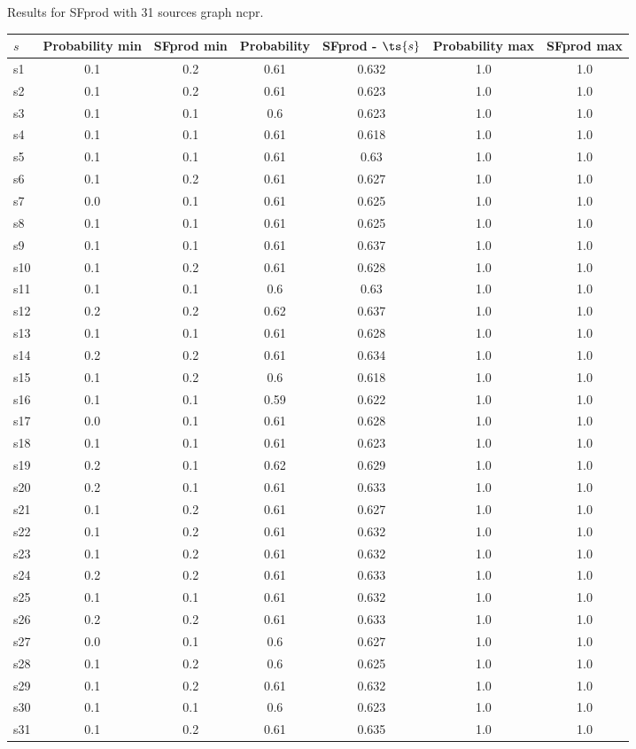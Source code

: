 \documentclass{article}
\begin{document}
\noindent Results for SFprod with 31 sources graph ncpr.

\noindent\begin{tabular}{|l|c|c|c|c|c|c|}
\hline
$s$& Probability min & SFprod min & Probability & SFprod - $\ts{s}$ & Probability max & SFprod max\\
\hline
s1 &0.1 & 0.2 & 0.61 & 0.632 & 1.0 & 1.0\\
\hline
s2 &0.1 & 0.2 & 0.61 & 0.623 & 1.0 & 1.0\\
\hline
s3 &0.1 & 0.1 & 0.6 & 0.623 & 1.0 & 1.0\\
\hline
s4 &0.1 & 0.1 & 0.61 & 0.618 & 1.0 & 1.0\\
\hline
s5 &0.1 & 0.1 & 0.61 & 0.63 & 1.0 & 1.0\\
\hline
s6 &0.1 & 0.2 & 0.61 & 0.627 & 1.0 & 1.0\\
\hline
s7 &0.0 & 0.1 & 0.61 & 0.625 & 1.0 & 1.0\\
\hline
s8 &0.1 & 0.1 & 0.61 & 0.625 & 1.0 & 1.0\\
\hline
s9 &0.1 & 0.1 & 0.61 & 0.637 & 1.0 & 1.0\\
\hline
s10 &0.1 & 0.2 & 0.61 & 0.628 & 1.0 & 1.0\\
\hline
s11 &0.1 & 0.1 & 0.6 & 0.63 & 1.0 & 1.0\\
\hline
s12 &0.2 & 0.2 & 0.62 & 0.637 & 1.0 & 1.0\\
\hline
s13 &0.1 & 0.1 & 0.61 & 0.628 & 1.0 & 1.0\\
\hline
s14 &0.2 & 0.2 & 0.61 & 0.634 & 1.0 & 1.0\\
\hline
s15 &0.1 & 0.2 & 0.6 & 0.618 & 1.0 & 1.0\\
\hline
s16 &0.1 & 0.1 & 0.59 & 0.622 & 1.0 & 1.0\\
\hline
s17 &0.0 & 0.1 & 0.61 & 0.628 & 1.0 & 1.0\\
\hline
s18 &0.1 & 0.1 & 0.61 & 0.623 & 1.0 & 1.0\\
\hline
s19 &0.2 & 0.1 & 0.62 & 0.629 & 1.0 & 1.0\\
\hline
s20 &0.2 & 0.1 & 0.61 & 0.633 & 1.0 & 1.0\\
\hline
s21 &0.1 & 0.2 & 0.61 & 0.627 & 1.0 & 1.0\\
\hline
s22 &0.1 & 0.2 & 0.61 & 0.632 & 1.0 & 1.0\\
\hline
s23 &0.1 & 0.2 & 0.61 & 0.632 & 1.0 & 1.0\\
\hline
s24 &0.2 & 0.2 & 0.61 & 0.633 & 1.0 & 1.0\\
\hline
s25 &0.1 & 0.1 & 0.61 & 0.632 & 1.0 & 1.0\\
\hline
s26 &0.2 & 0.2 & 0.61 & 0.633 & 1.0 & 1.0\\
\hline
s27 &0.0 & 0.1 & 0.6 & 0.627 & 1.0 & 1.0\\
\hline
s28 &0.1 & 0.2 & 0.6 & 0.625 & 1.0 & 1.0\\
\hline
s29 &0.1 & 0.2 & 0.61 & 0.632 & 1.0 & 1.0\\
\hline
s30 &0.1 & 0.1 & 0.6 & 0.623 & 1.0 & 1.0\\
\hline
s31 &0.1 & 0.2 & 0.61 & 0.635 & 1.0 & 1.0\\
\hline
\end{tabular}\\
\end{document}
